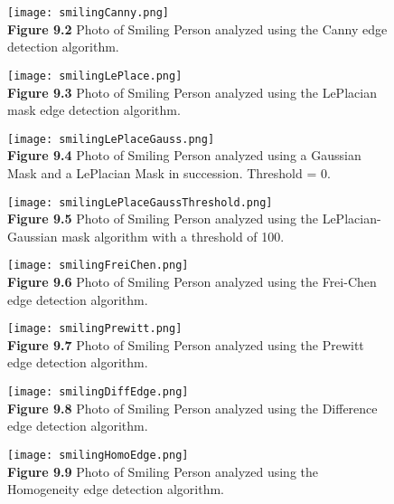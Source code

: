 \documentclass{article}%
\begin{document}
\newpage
\begin{figure}[h]
\centering
\texttt{[image: smilingCanny.png]}\\
{\bf Figure 9.2} Photo of Smiling Person analyzed using the Canny edge detection algorithm.   
\end{figure}

\newpage
\begin{figure}[h]
\centering
\texttt{[image: smilingLePlace.png]}\\
{\bf Figure 9.3} Photo of Smiling Person analyzed using the LePlacian mask edge detection algorithm.  
\end{figure}

\newpage
\begin{figure}[h]
\centering
\texttt{[image: smilingLePlaceGauss.png]}\\
{\bf Figure 9.4} Photo of Smiling Person analyzed using a Gaussian Mask and a LePlacian Mask in succession. Threshold = 0.   
\end{figure}

\newpage
\begin{figure}[h]
\centering
\texttt{[image: smilingLePlaceGaussThreshold.png]}\\
{\bf Figure 9.5} Photo of Smiling Person analyzed using the LePlacian-Gaussian mask algorithm with a threshold of 100.  
\end{figure}

\newpage
\begin{figure}[h]
\centering
\texttt{[image: smilingFreiChen.png]}\\
{\bf Figure 9.6} Photo of Smiling Person analyzed using the Frei-Chen edge detection algorithm.  
\end{figure}

\newpage
\begin{figure}[h]
\centering
\texttt{[image: smilingPrewitt.png]}\\
{\bf Figure 9.7} Photo of Smiling Person analyzed using the Prewitt edge detection algorithm.  
\end{figure}

\newpage
\begin{figure}[h]
\centering
\texttt{[image: smilingDiffEdge.png]}\\
{\bf Figure 9.8} Photo of Smiling Person analyzed using the Difference edge detection algorithm.  
\end{figure}

\newpage
\begin{figure}[h]
\centering
\texttt{[image: smilingHomoEdge.png]}\\
{\bf Figure 9.9} Photo of Smiling Person analyzed using the Homogeneity edge detection algorithm.  
\end{figure}
\end{document}
